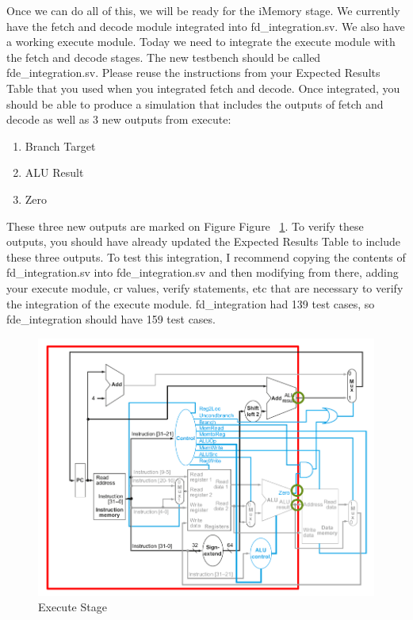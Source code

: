 Once we can do all of this, we will be ready for the iMemory stage.  We currently have the fetch and decode module integrated into fd\_integration.sv.  We also have a working execute module.  Today we need to integrate the execute module with the fetch and decode stages.  The new testbench should be called fde\_integration.sv.  Please reuse the instructions from your Expected Results Table that you used when you integrated fetch and decode.  Once integrated, you should be able to produce a simulation that includes the outputs of fetch and decode as well as 3 new outputs from execute:
\begin{enumerate}
	\item Branch Target
	\item ALU Result
	\item Zero
\end{enumerate}   

These three new outputs are marked on Figure Figure ~\ref{fig:integrated_execute}.  To verify these outputs, you should have already  updated the Expected Results Table to include these three outputs.  To test this integration, I recommend copying the contents of fd\_integration.sv into fde\_integration.sv and then modifying from there, adding your execute module, cr values, verify statements, etc that are necessary to verify the integration of the execute module. fd\_integration had 139 test cases, so fde\_integration should have 159 test cases.

\begin{figure}
	\caption{Execute Stage}\label{fig:integrated_execute}
	\begin{center}
		\includegraphics[width=4.75in]{../images/integrated_execute.png}
	\end{center}
\end{figure} 

